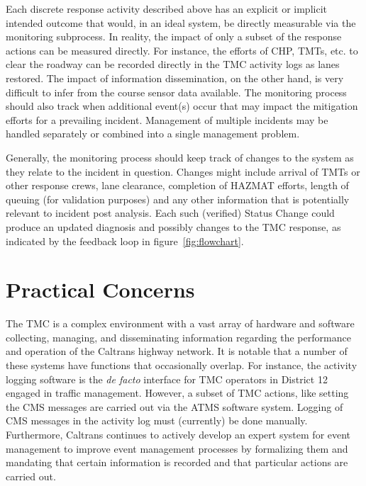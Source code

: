 \documentclass[12pt]{report}
\begin{document}
Each discrete response activity described above has an explicit or implicit
intended outcome that would, in an ideal system, be directly measurable via the
monitoring subprocess.  In reality, the impact of only a subset of the response
actions can be measured directly.  For instance, the efforts of \ac{CHP},
\acp{TMT}, etc. to clear the roadway can be recorded directly in the \ac{TMC}
activity logs as lanes restored.  The impact of information dissemination, on
the other hand, is very difficult to infer from the course sensor data
available.  The monitoring process should also track when additional event(s)
occur that may impact the mitigation efforts for a prevailing incident.
Management of multiple incidents may be handled separately or combined into a
single management problem.

Generally, the monitoring process should keep track of changes to the system as
they relate to the incident in question.  Changes might include arrival of
\ac{TMT}s or other response crews, lane clearance, completion of \ac{HAZMAT}
efforts, length of queuing (for validation purposes) and any other information
that is potentially relevant to incident post analysis.  Each such (verified)
{\sc Status Change} could produce an updated diagnosis and possibly changes to
the \ac{TMC} response, as indicated by the feedback loop in
figure~\ref{fig:flowchart}.


\section{Practical Concerns}
\label{sec:practical-concerns}

The \ac{TMC} is a complex environment with a vast array of hardware and software
collecting, managing, and disseminating information regarding the performance
and operation of the Caltrans highway network.  It is notable that a number of
these systems have functions that occasionally overlap.  For instance, the
activity logging software is the \emph{de facto} interface for \ac{TMC}
operators in District 12 engaged in traffic management.  However, a subset of
\ac{TMC} actions, like setting the \ac{CMS} messages are carried out via the
\ac{ATMS} software system.  Logging of \ac{CMS} messages in the activity log
must (currently) be done manually.  Furthermore, Caltrans continues to actively
develop an expert system for event management to improve event management
processes by formalizing them and mandating that certain information is recorded
and that particular actions are carried out.
\end{document}
